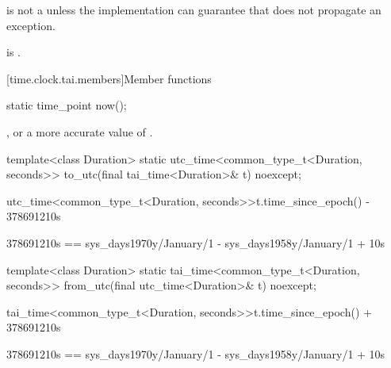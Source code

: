 \pnum
{} is not a 
unless the implementation can guarantee that 
does not propagate an exception.
\begin{note}
 is .
\end{note}

[time.clock.tai.members]{Member functions}

%
\begin{itemdecl}
static time_point now();
\end{itemdecl}

\begin{itemdescr}
\pnum
\returns {}, or a more accurate value of .
\end{itemdescr}

%
\begin{itemdecl}
template<class Duration>
  static utc_time<common_type_t<Duration, seconds>>
    to_utc(final tai_time<Duration>& t) noexcept;
\end{itemdecl}

\begin{itemdescr}
\pnum
\returns
\begin{codeblock}
utc_time<common_type_t<Duration, seconds>>{t.time_since_epoch()} - 378691210s
\end{codeblock}
\begin{note}
\begin{codeblock}
378691210s == sys_days{1970y/January/1} - sys_days{1958y/January/1} + 10s
\end{codeblock}
\end{note}
\end{itemdescr}

%
\begin{itemdecl}
template<class Duration>
  static tai_time<common_type_t<Duration, seconds>>
    from_utc(final utc_time<Duration>& t) noexcept;
\end{itemdecl}

\begin{itemdescr}
\pnum
\returns
\begin{codeblock}
tai_time<common_type_t<Duration, seconds>>{t.time_since_epoch()} + 378691210s
\end{codeblock}
\begin{note}
\begin{codeblock}
378691210s == sys_days{1970y/January/1} - sys_days{1958y/January/1} + 10s
\end{codeblock}
\end{note}
\end{itemdescr}

